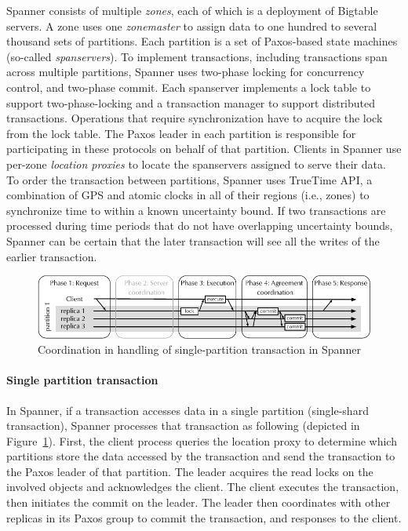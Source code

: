 Spanner consists of multiple \emph{zones}, each of which is a deployment of
Bigtable servers. A zone uses one \emph{zonemaster} to assign data to one
hundred to several thousand sets of partitions. Each partition is a set of
Paxos-based state machines (so-called \emph{spanservers}).  To implement
transactions, including transactions span across multiple partitions, Spanner
uses two-phase locking for concurrency control, and two-phase commit. Each
spanserver implements a lock table to support two-phase-locking and a
transaction manager to support distributed transactions. Operations that
require synchronization have to acquire the lock from the lock table. The Paxos
leader in each partition is responsible for participating in these protocols on
behalf of that partition. Clients in Spanner use per-zone \emph{location
proxies} to locate the spanservers assigned to serve their data. To order the
transaction between partitions, Spanner uses TrueTime API, a combination of GPS
and atomic clocks in all of their regions (i.e., zones) to synchronize time to
within a known uncertainty bound. If two transactions are processed during time
periods that do not have overlapping uncertainty bounds, Spanner can be certain
that the later transaction will see all the writes of the earlier transaction.

\begin{figure}[ht!]
  \begin{minipage}[b]{1.0\linewidth}
  \centering
        \includegraphics[width=1\linewidth]{figures/spanner-single-partition}
  \end{minipage}
  \caption{Coordination in handling of single-partition transaction in Spanner}
  \label{fig:spanner-single-partition}
\end{figure}

\paragraph{Single partition transaction} In Spanner, if a transaction accesses
data in a single partition (single-shard transaction), Spanner processes that
transaction as following (depicted in
Figure~\ref{fig:spanner-single-partition}). First, the client process queries
the location proxy to determine which partitions store the data accessed by the
transaction and send the transaction to the Paxos leader of that partition. The
leader acquires the read locks on the involved objects and acknowledges the client.
The client executes the transaction, then initiates the commit on the leader. The
leader then coordinates with other replicas in its Paxos group to commit the
transaction, and responses to the client.

